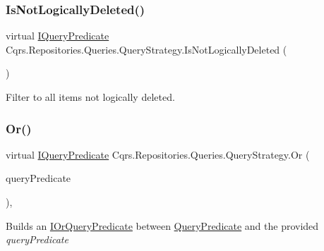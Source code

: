 \subsubsection{\texorpdfstring{Is\+Not\+Logically\+Deleted()}{IsNotLogicallyDeleted()}}
{\footnotesize\ttfamily virtual \hyperlink{interfaceCqrs_1_1Repositories_1_1Queries_1_1IQueryPredicate}{I\+Query\+Predicate} Cqrs.\+Repositories.\+Queries.\+Query\+Strategy.\+Is\+Not\+Logically\+Deleted (\begin{DoxyParamCaption}{ }\end{DoxyParamCaption})\hspace{0.3cm}{\ttfamily [virtual]}}



Filter to all items not logically deleted. 

\mbox{\label{classCqrs_1_1Repositories_1_1Queries_1_1QueryStrategy_a96f4657370c8cd0d20465d2855ea2fd7_a96f4657370c8cd0d20465d2855ea2fd7}} 
\subsubsection{\texorpdfstring{Or()}{Or()}}
{\footnotesize\ttfamily virtual \hyperlink{interfaceCqrs_1_1Repositories_1_1Queries_1_1IQueryPredicate}{I\+Query\+Predicate} Cqrs.\+Repositories.\+Queries.\+Query\+Strategy.\+Or (\begin{DoxyParamCaption}\item[{\hyperlink{interfaceCqrs_1_1Repositories_1_1Queries_1_1IQueryPredicate}{I\+Query\+Predicate}}]{query\+Predicate }\end{DoxyParamCaption})\hspace{0.3cm}{\ttfamily [protected]}, {\ttfamily [virtual]}}



Builds an \hyperlink{interfaceCqrs_1_1Repositories_1_1Queries_1_1IOrQueryPredicate}{I\+Or\+Query\+Predicate} between \hyperlink{classCqrs_1_1Repositories_1_1Queries_1_1QueryPredicate}{Query\+Predicate} and the provided {\itshape query\+Predicate}  

\mbox{\label{classCqrs_1_1Repositories_1_1Queries_1_1QueryStrategy_a7fda4380a88972201258bf695ccaf287_a7fda4380a88972201258bf695ccaf287}} 
